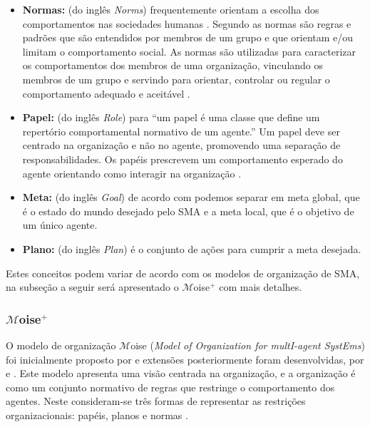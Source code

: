 \begin{itemize}

\item \textbf{Normas:} (do inglês \textit{Norms}) frequentemente orientam a escolha dos comportamentos nas sociedades humanas \cite{sen2007emergence}. Segundo \citet{cialdini1998social} as normas são regras e padrões que são entendidos por membros de um grupo e que orientam e/ou limitam o comportamento social. As normas são utilizadas para caracterizar os comportamentos dos membros de uma organização, vinculando os membros de um grupo e servindo para orientar, controlar ou regular o comportamento adequado e aceitável \cite{jennings2000agent}.

\item \textbf{Papel:} (do inglês \textit{Role}) para \citet{odell2002role} “um papel é uma classe que define um repertório comportamental normativo de um agente.” Um papel deve ser centrado na organização e não no agente, promovendo uma separação de responsabilidades. Os papéis prescrevem um comportamento esperado do agente orientando como interagir na organização \cite{tinnemeier2009roles}.

\item \textbf{Meta:} (do inglês \textit{Goal}) de acordo com \cite{hubner2003modelo} podemos separar em meta global, que é o estado do mundo desejado pelo SMA e a meta local, que é o objetivo de um único agente.

\item \textbf{Plano:} (do inglês \textit{Plan}) é o conjunto de ações para cumprir a meta desejada.
\end{itemize}

Estes conceitos podem variar de acordo com os modelos de organização de SMA, na subseção a seguir será apresentado o $\mathcal{M}$oise$^{+}$ com mais detalhes.

\subsubsection{$\mathcal{M}$oise$^{+}$}

O modelo de organização $\mathcal{M}$oise (\textit{Model of Organization for multI-agent SystEms}) foi inicialmente proposto por \cite{hannoun2000moise} e extensões posteriormente foram desenvolvidas, por \cite{hubner2003modelo} e \cite{hubner2005mathcal}. Este modelo apresenta uma visão centrada na organização, e a organização é como um conjunto normativo de regras que restringe o comportamento dos agentes. Neste consideram-se três formas de representar as restrições organizacionais: papéis, planos e normas \cite{hannoun2000moise}.

